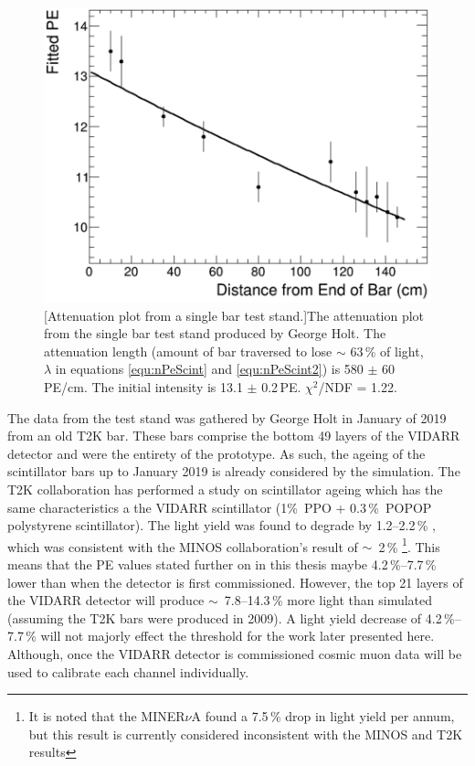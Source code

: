 \begin{figure}[!h]
 \centering
 \includegraphics[width=0.6\linewidth]{Chapter4/attenuation_plot_no_box.png} 
 [Attenuation plot from a single bar test stand.]{The attenuation plot from the single bar test stand produced by George Holt. The attenuation length (amount of bar traversed to lose $\sim$ 63\,\%  of light, $\lambda$ in equations \ref{equ:nPeScint} and \ref{equ:nPeScint2}) is 580 $\pm$ 60\,PE/cm. The initial intensity is 13.1 $\pm$ 0.2\,PE. $\chi^2$/NDF = 1.22.} 
 \label{fig:attenuationPlot}
\end{figure}

The data from the test stand was gathered by George Holt in January of 2019 from an old T2K bar. These bars comprise the bottom 49 layers of the VIDARR detector and were the entirety of the prototype. As such, the ageing of the scintillator bars up to January 2019 is already considered by the simulation. The T2K collaboration has performed a study on scintillator ageing which has the same characteristics a the VIDARR scintillator (1\%~PPO + 0.3\,\%~POPOP polystyrene scintillator). The light yield was found to degrade by 1.2--2.2\,\% \cite{t2k_scintillatorAging2022}, which was consistent with the MINOS collaboration's result of $\sim$~2\,\% \cite{t2k_scintillatorAging2022} \cite{minosAging2008}\footnote{It is noted that the MINER$\nu$A found a 7.5\,\% drop in light yield per annum, but this result is currently considered inconsistent with the MINOS and T2K results\cite{t2k_scintillatorAging2022} }. This means that the PE values stated further on in this thesis maybe 4.2\,\%--7.7\,\% lower than when the detector is first commissioned. However, the top 21 layers of the VIDARR detector will produce $\sim$~7.8--14.3\,\% more light than simulated (assuming the T2K bars were produced in 2009). A light yield decrease of 4.2\,\%--7.7\,\% will not majorly effect the threshold for the work later presented here. Although, once the VIDARR detector is commissioned cosmic muon data will be used to calibrate each channel individually. 

